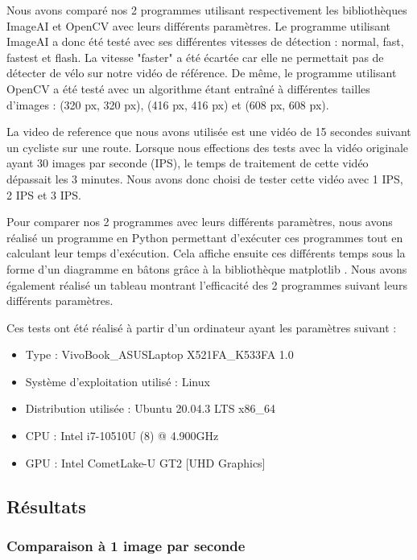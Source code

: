 Nous avons comparé nos 2 programmes utilisant respectivement les bibliothèques ImageAI et OpenCV avec leurs différents paramètres.
Le programme utilisant ImageAI a donc été testé avec ses différentes vitesses de détection : normal, fast, fastest et flash.
La vitesse "faster" a été écartée car elle ne permettait pas de détecter de vélo sur notre vidéo de référence.
De même, le programme utilisant OpenCV a été testé avec un algorithme étant entraîné à différentes tailles d'images :
(320 px, 320 px), (416 px, 416 px) et (608 px, 608 px).

La \gls{video de reference} que nous avons utilisée est une vidéo de 15 secondes suivant un cycliste sur une route.
Lorsque nous effections des tests avec la vidéo originale ayant 30 images par seconde (IPS),
le temps de traitement de cette vidéo dépassait les 3 minutes.
Nous avons donc choisi de tester cette vidéo avec 1 IPS, 2 IPS et 3 IPS.

Pour comparer nos 2 programmes avec leurs différents paramètres, nous avons réalisé un programme en Python permettant
d'exécuter ces programmes tout en calculant leur temps d'exécution.
Cela affiche ensuite ces différents temps sous la forme d'un diagramme en bâtons grâce à la bibliothèque matplotlib \cite{matplotlib}.
Nous avons également réalisé un tableau montrant l'efficacité des 2 programmes suivant leurs différents paramètres.

Ces tests ont été réalisé à partir d'un ordinateur ayant les paramètres suivant :
\begin{itemize}
    \item Type : VivoBook\_ASUSLaptop X521FA\_K533FA 1.0
    \item Système d'exploitation utilisé : Linux
    \item Distribution utilisée : Ubuntu 20.04.3 LTS x86\_64
    \item \gls{CPU} : Intel i7-10510U (8) @ 4.900GHz
    \item \gls{GPU} : Intel CometLake-U GT2 [UHD Graphics]
\end{itemize}

\subsection{Résultats}
\label{sec:comparaisonIA:resultats}

\subsubsection{Comparaison à 1 image par seconde}
\label{sec:comparaisonIA:resultats:1fps}

